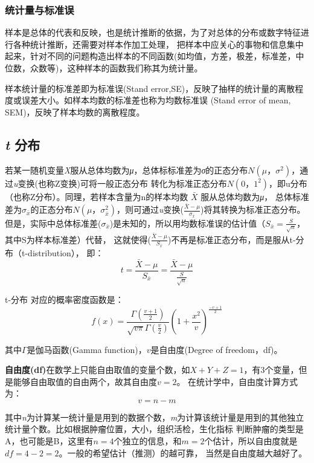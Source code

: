 \documentclass[
]{article}
\begin{document}
\hypertarget{ux7edfux8ba1ux91cfux4e0eux6807ux51c6ux8bef}{%
\subsubsection{统计量与标准误}\label{ux7edfux8ba1ux91cfux4e0eux6807ux51c6ux8bef}}

样本是总体的代表和反映，也是统计推断的依据，为了对总体的分布或数字特征进行各种统计推断，还需要对样本作加工处理，
把样本中应关心的事物和信息集中起来，针对不同的问题构造出样本的不同函数(如均值，方差，极差，标准差，中位数，众数等)，这种样本的函数我们称其为统计量。

样本统计量的标准差即为标准误(Stand error,SE)，反映了抽样的统计量的离散程度或误差大小。如样本均数的标准差也称为均数标准误
(Stand error of mean, SEM)，反映了样本均数的离散程度。

\hypertarget{t-ux5206ux5e03}{%
\subsection{\texorpdfstring{\emph{t} 分布}{t 分布}}\label{t-ux5206ux5e03}}

若某一随机变量\emph{X}服从总体均数为\emph{μ}，总体标标准差为\emph{σ}的正态分布\(N(μ，σ^2)\)，通过\emph{u}变换(也称Z变换)可将一般正态分布
转化为标准正态分布\(N(0，1^2)\)，即u分布（也称Z分布）。同理，若样本含量为n的样本均数 \(\bar{X}\) 服从总体均数为\emph{μ}，
总体标准差为\(σ_\bar{x}\)的正态分布\(N(μ，σ_\bar{x}^2)\)，则可通过\emph{u}变换(\(\frac{\bar{X}-μ}{σ_\bar{x}}\))将其转换为标准正态分布。
但是，实际中总体标准差(\(σ_\bar{x}\))是未知的，所以用均数标准误的估计值（\(S_\bar{x}=\frac{S}{\sqrt{n}}\)，其中S为样本标准差）代替，
这就使得(\(\frac{\bar{X}-μ}{S_\bar{x}}\))不再是标准正态分布，而是服从t-分布（t-distribution），
即：
\[t=\frac{\bar{X}-μ}{S_\bar{x}}=\frac{\bar{X}-μ}{\frac{S}{\sqrt{n}}}\]

t-分布 对应的概率密度函数是：
\[f(x)=\frac{\Gamma(\frac{v+1}{2})}{\sqrt{v\pi}\Gamma(\frac{v}{2})}{\left(1+\frac{x^2}{v}\right)^\frac{-v+1}{2}}\]

其中\(\Gamma\)是伽马函数(Gamma function)，\(v\)是自由度(Degree of freedom，df)。

\textbf{自由度(df)}在数学上只能自由取值的变量个数，如\(X+Y+Z=1\)，有3个变量，但是能够自由取值的自由两个，故其自由度\(v=2\)。
在统计学中，自由度计算方式为：
\[v=n-m\]

其中\emph{n}为计算某一统计量是用到的数据个数，\emph{m}为计算该统计量是用到的其他独立统计量个数。比如根据肿瘤位置，大小，组织活检，生化指标
判断肿瘤的类型是A，也可能是B，这里有\(n=4\)个独立的信息，和\(m=2\)个估计，所以自由度就是\(df=4-2=2\)。一般的希望估计（推测）的越可靠，
当然是自由度越大越好了。
\end{document}

